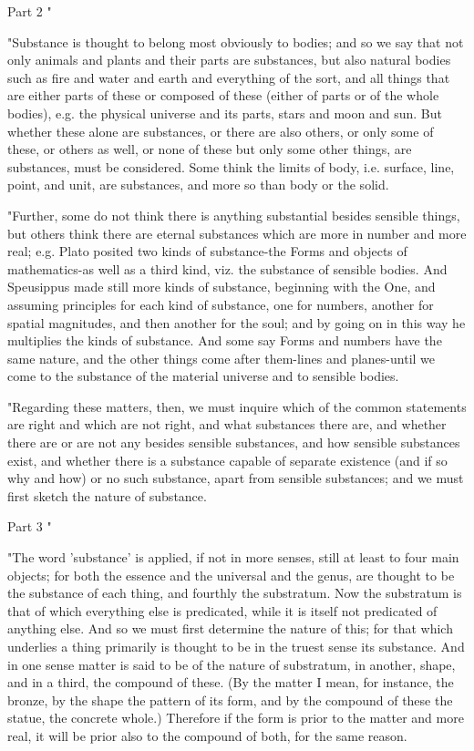 Part 2 "

"Substance is thought to belong most obviously to bodies; and so we
say that not only animals and plants and their parts are substances,
but also natural bodies such as fire and water and earth and everything
of the sort, and all things that are either parts of these or composed
of these (either of parts or of the whole bodies), e.g. the physical
universe and its parts, stars and moon and sun. But whether these
alone are substances, or there are also others, or only some of these,
or others as well, or none of these but only some other things, are
substances, must be considered. Some think the limits of body, i.e.
surface, line, point, and unit, are substances, and more so than body
or the solid. 

"Further, some do not think there is anything substantial besides
sensible things, but others think there are eternal substances which
are more in number and more real; e.g. Plato posited two kinds of
substance-the Forms and objects of mathematics-as well as a third
kind, viz. the substance of sensible bodies. And Speusippus made still
more kinds of substance, beginning with the One, and assuming principles
for each kind of substance, one for numbers, another for spatial magnitudes,
and then another for the soul; and by going on in this way he multiplies
the kinds of substance. And some say Forms and numbers have the same
nature, and the other things come after them-lines and planes-until
we come to the substance of the material universe and to sensible
bodies. 

"Regarding these matters, then, we must inquire which of the common
statements are right and which are not right, and what substances
there are, and whether there are or are not any besides sensible substances,
and how sensible substances exist, and whether there is a substance
capable of separate existence (and if so why and how) or no such substance,
apart from sensible substances; and we must first sketch the nature
of substance. 

Part 3 "

"The word 'substance' is applied, if not in more senses, still at
least to four main objects; for both the essence and the universal
and the genus, are thought to be the substance of each thing, and
fourthly the substratum. Now the substratum is that of which everything
else is predicated, while it is itself not predicated of anything
else. And so we must first determine the nature of this; for that
which underlies a thing primarily is thought to be in the truest sense
its substance. And in one sense matter is said to be of the nature
of substratum, in another, shape, and in a third, the compound of
these. (By the matter I mean, for instance, the bronze, by the shape
the pattern of its form, and by the compound of these the statue,
the concrete whole.) Therefore if the form is prior to the matter
and more real, it will be prior also to the compound of both, for
the same reason. 


